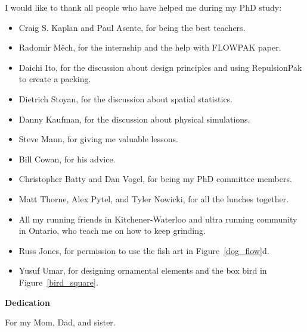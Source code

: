I would like to thank all people who have helped me during my PhD study:


\begin{itemize}  
\item Craig S. Kaplan and Paul Asente, for being the best teachers.
\item Radom\'ir M\v{e}ch, for the internship and the help with FLOWPAK paper. 
\item Daichi Ito, for the discussion about design principles and using RepulsionPak to create a packing.
\item Dietrich Stoyan, for the discussion about spatial statistics.
\item Danny Kaufman, for the discussion about physical simulations.
\item Steve Mann, for giving me valuable lessons.
\item Bill Cowan, for his advice.
\item Christopher Batty and Dan Vogel, for being my PhD committee members.
\item Matt Thorne, Alex Pytel, and Tyler Nowicki, for all the lunches together. 
\item All my running friends in Kitchener-Waterloo and ultra running community in \mbox{Ontario}, 
who teach me on how to keep grinding.
\item Russ Jones, for permission to use the fish art in Figure~\ref{dog_flow}d.
\item Yusuf Umar, for designing ornamental elements and the box bird in Figure~\ref{bird_square}.
\end{itemize}

\cleardoublepage


\begin{center}\textbf{Dedication}\end{center}

For my Mom, Dad, and sister.
\cleardoublepage

\renewcommand\contentsname{Table of Contents}
\tableofcontents
\cleardoublepage
{}    %

\listoftables
\cleardoublepage
{}		%

\listoffigures
\cleardoublepage
{}		%

\printglossaries
\cleardoublepage
{}		%


